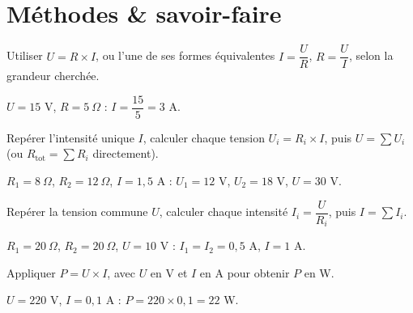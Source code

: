 \section{Méthodes \& savoir-faire}

Utiliser $U=R\times I$, ou l'une de ses formes équivalentes $I=\dfrac UR$, $R=\dfrac UI$,
selon la grandeur cherchée.
\begin{exemple}
$U=15$ V, $R=5\ \Omega$ : $I=\dfrac{15}5=3$ A.
\end{exemple}

Repérer l'intensité unique $I$, calculer chaque tension $U_i=R_i\times I$, puis
$U=\sum U_i$ (ou $R_{\text{tot}}=\sum R_i$ directement).
\begin{exemple}
$R_1=8\ \Omega$, $R_2=12\ \Omega$, $I=1{,}5$ A : $U_1=12$ V, $U_2=18$ V, $U=30$ V.
\end{exemple}

Repérer la tension commune $U$, calculer chaque intensité $I_i=\dfrac U{R_i}$, puis
$I=\sum I_i$.
\begin{exemple}
$R_1=20\ \Omega$, $R_2=20\ \Omega$, $U=10$ V : $I_1=I_2=0{,}5$ A, $I=1$ A.
\end{exemple}

Appliquer $P=U\times I$, avec $U$ en V et $I$ en A pour obtenir $P$ en W.
\begin{exemple}
$U=220$ V, $I=0{,}1$ A : $P=220\times0{,}1=22$ W.
\end{exemple}

